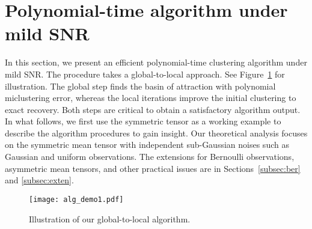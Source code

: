 \documentclass[lettersize,onecolumn,journal]{IEEEtran}
\theoremstyle{definition}
\theoremstyle{definition}
\newtheorem{rmk}{Remark}
\begin{document}



\section{Polynomial-time algorithm under mild SNR}\label{sec:alg}
In this section, we present an efficient polynomial-time clustering algorithm under mild SNR. The procedure takes a global-to-local approach. See Figure~\ref{fig:demo} for illustration. The global step finds the basin of attraction with polynomial miclustering error, whereas the local iterations improve the initial clustering to exact recovery. Both steps are critical to obtain a satisfactory algorithm output. In what follows, we first use the symmetric tensor as a working example to describe the algorithm procedures to gain insight.    {Our theoretical analysis focuses on the symmetric mean tensor with independent sub-Gaussian noises} 
such as Gaussian and uniform observations.   {The extensions for Bernoulli observations, asymmetric mean tensors, and other practical issues are in Sections~\ref{subsec:ber} and \ref{subsec:exten}.}

\begin{figure}[ht!]
\centering
\texttt{[image: alg\_demo1.pdf]}
\caption{Illustration of our global-to-local algorithm.}\label{fig:demo}
\end{figure}
\end{document}
